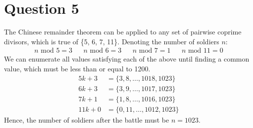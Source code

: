 \section*{Question 5}

The Chinese remainder theorem can be applied to any set of pairwise coprime divisors, which is true of \{5, 6, 7, 11\}. Denoting the number of soldiers $n$:
\begin{align*}
    n \text{ mod } 5 = 3 && n \text{ mod } 6 = 3 && n \text{ mod } 7 = 1 && n \text{ mod } 11 = 0
\end{align*}
We can enumerate all values satisfying each of the above until finding a common value, which must be less than or equal to 1200.
\begin{align*}
    5k + 3  &= \{3, 8, \dots, 1018, 1023\} \\
    6k + 3  &= \{3, 9, \dots, 1017, 1023\} \\
    7k + 1  &= \{1, 8, \dots, 1016, 1023\} \\
    11k + 0 &= \{0, 11, \dots, 1012, 1023\}
\end{align*}
Hence, the number of soldiers after the battle must be $n=1023$.
